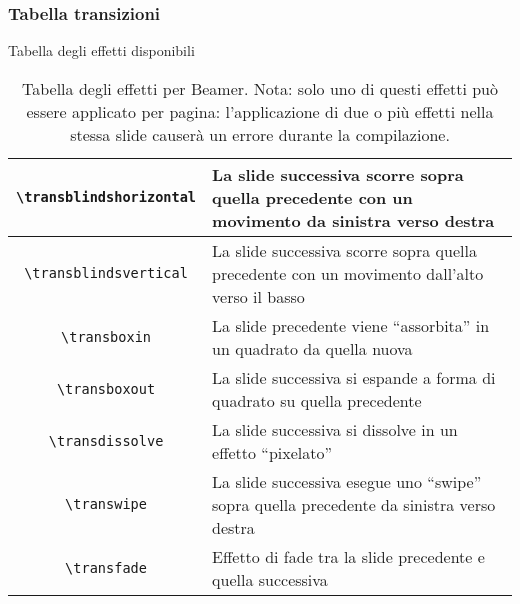 \begin{frame}[allowframebreaks]
  \frametitle{Tabella transizioni}
  
  Tabella degli effetti disponibili
 


\begin{table}[t]
\centering
\begin{xtabular}{|c|p{5cm}|}
\hline

\texttt{\textbackslash transblindshorizontal} & La slide successiva scorre 
sopra quella precedente con un movimento da sinistra verso destra \\ \hline
\texttt{\textbackslash transblindsvertical}   & La slide successiva scorre 
sopra quella precedente con un movimento dall'alto verso il basso \\ \hline
\texttt{\textbackslash transboxin}            & La slide precedente viene 
``assorbita'' in un quadrato da quella nuova                       \\ \hline
\texttt{\textbackslash transboxout}           & La slide successiva si espande 
a forma di quadrato su quella precedente                      \\ \hline
\texttt{\textbackslash transdissolve}         & La slide successiva si dissolve 
in un effetto ``pixelato''                                   \\ \hline
\texttt{\textbackslash transwipe}             & La slide successiva esegue uno 
``swipe'' sopra quella precedente da sinistra verso destra    \\ \hline
\texttt{\textbackslash transfade}             & Effetto di fade tra la slide 
precedente e quella successiva                                  \\ \hline
\end{xtabular}
\caption[Tabella degli effetti Beamer]{Tabella degli effetti per Beamer. Nota:
solo uno di questi effetti può essere applicato per pagina: l'applicazione di
due o più effetti nella stessa slide causerà un errore durante la compilazione.}
\label{tab:beamer_effects}
\end{table}
\end{frame}
